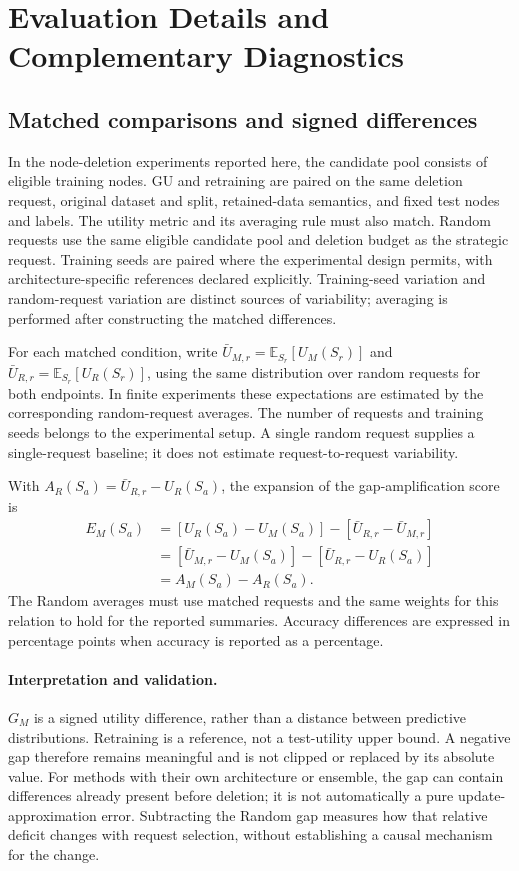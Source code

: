 \section{Evaluation Details and Complementary Diagnostics}
\label{app:evaluation-details}

\subsection{Matched comparisons and signed differences}
\label{app:matching}
In the node-deletion experiments reported here, the candidate pool consists of eligible training nodes. GU and retraining are paired on the same deletion request, original dataset and split, retained-data semantics, and fixed test nodes and labels. The utility metric and its averaging rule must also match. Random requests use the same eligible candidate pool and deletion budget as the strategic request. Training seeds are paired where the experimental design permits, with architecture-specific references declared explicitly. Training-seed variation and random-request variation are distinct sources of variability; averaging is performed after constructing the matched differences.

For each matched condition, write $\bar U_{M,r}=\mathbb E_{S_r}[U_M(S_r)]$ and $\bar U_{R,r}=\mathbb E_{S_r}[U_R(S_r)]$, using the same distribution over random requests for both endpoints. In finite experiments these expectations are estimated by the corresponding random-request averages. The number of requests and training seeds belongs to the experimental setup. A single random request supplies a single-request baseline; it does not estimate request-to-request variability.

With $A_R(S_a)=\bar U_{R,r}-U_R(S_a)$, the expansion of the gap-amplification score is
\begin{equation}
\begin{aligned}
E_M(S_a)
&=[U_R(S_a)-U_M(S_a)]-[\bar U_{R,r}-\bar U_{M,r}]\\
&=[\bar U_{M,r}-U_M(S_a)]-[\bar U_{R,r}-U_R(S_a)]\\
&=A_M(S_a)-A_R(S_a).
\end{aligned}
\end{equation}
The Random averages must use matched requests and the same weights for this relation to hold for the reported summaries. Accuracy differences are expressed in percentage points when accuracy is reported as a percentage.

\paragraph{Interpretation and validation.}
$G_M$ is a signed utility difference, rather than a distance between predictive distributions. Retraining is a reference, not a test-utility upper bound. A negative gap therefore remains meaningful and is not clipped or replaced by its absolute value. For methods with their own architecture or ensemble, the gap can contain differences already present before deletion; it is not automatically a pure update-approximation error. Subtracting the Random gap measures how that relative deficit changes with request selection, without establishing a causal mechanism for the change.

